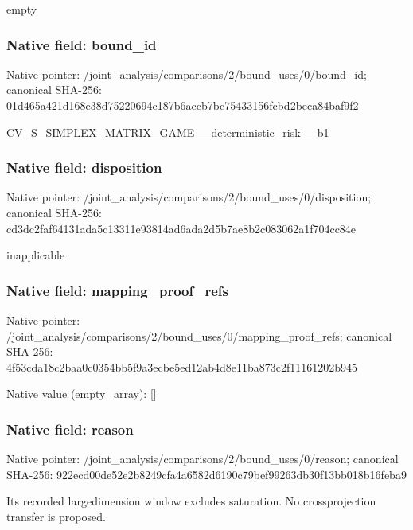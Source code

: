 \documentclass[10pt,a4paper]{article}
\begin{document}
empty


\subsubsection{Native field: bound\_id}


Native pointer: /joint\_analysis/comparis\allowbreak{}ons/2/bound\_uses/0/bound\allowbreak{}\_id; canonical SHA-256: 01d465a421d168e38d752206\allowbreak{}94c187b6accb7bc75433156f\allowbreak{}cbd2beca84baf9f2


CV\_S\_SIMPLEX\_MATRIX\_GAME\allowbreak{}\_\_deterministic\_risk\_\_b1


\subsubsection{Native field: disposition}


Native pointer: /joint\_analysis/comparis\allowbreak{}ons/2/bound\_uses/0/dispo\allowbreak{}sition; canonical SHA-256: cd3dc2faf64131ada5c13311\allowbreak{}e93814ad6ada2d5b7ae8b2c0\allowbreak{}83062a1f704cc84e


inapplicable


\subsubsection{Native field: mapping\_proof\_refs}


Native pointer: /joint\_analysis/comparis\allowbreak{}ons/2/bound\_uses/0/mappi\allowbreak{}ng\_proof\_refs; canonical SHA-256: 4f53cda18c2baa0c0354bb5f\allowbreak{}9a3ecbe5ed12ab4d8e11ba87\allowbreak{}3c2f11161202b945



Native value (empty\_array): []



\subsubsection{Native field: reason}


Native pointer: /joint\_analysis/comparis\allowbreak{}ons/2/bound\_uses/0/reaso\allowbreak{}n; canonical SHA-256: 922ecd00de52e2b8249cfa4a\allowbreak{}6582d6190c79bef99263db30\allowbreak{}f13bb018b16feba9


Its recorded largedimension window excludes saturation. No crossprojection transfer is proposed.
\end{document}
